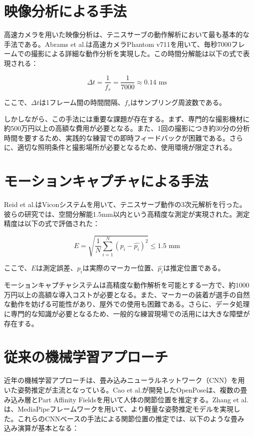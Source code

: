 \documentclass[oneside]{suribt}[11pt]
\begin{document}
\section{映像分析による手法}
高速カメラを用いた映像分析は、テニスサーブの動作解析において最も基本的な手法である。Abrams et al.\cite{abrams2018}は高速カメラPhantom v711を用いて、毎秒7000フレームでの撮影による詳細な動作分析を実現した。この時間分解能は以下の式で表現される：

\begin{equation}
\Delta t = \frac{1}{f_{s}} = \frac{1}{7000} \approx 0.14 \text{ ms}
\end{equation}

ここで、$\Delta t$は1フレーム間の時間間隔、$f_{s}$はサンプリング周波数である。

しかしながら、この手法には重要な課題が存在する。まず、専門的な撮影機材に約500万円以上の高額な費用が必要となる。また、1回の撮影につき約30分の分析時間を要するため、実践的な練習での即時フィードバックが困難である。さらに、適切な照明条件と撮影場所が必要となるため、使用環境が限定される。

\section{モーションキャプチャによる手法}
Reid et al.\cite{serve_analysis}はViconシステムを用いて、テニスサーブ動作の3次元解析を行った。彼らの研究では、空間分解能1.5mm以内という高精度な測定が実現された。測定精度は以下の式で評価された：

\begin{equation}
E = \sqrt{\frac{1}{N}\sum_{i=1}^{N} (p_i - \hat{p_i})^2} \leq 1.5 \text{ mm}
\end{equation}

ここで、$E$は測定誤差、$p_i$は実際のマーカー位置、$\hat{p_i}$は推定位置である。

モーションキャプチャシステムは高精度な動作解析を可能とする一方で、約1000万円以上の高額な導入コストが必要となる。また、マーカーの装着が選手の自然な動作を妨げる可能性があり、屋外での使用も困難である。さらに、データ処理に専門的な知識が必要となるため、一般的な練習現場での活用には大きな障壁が存在する。

\section{従来の機械学習アプローチ}
近年の機械学習アプローチは、畳み込みニューラルネットワーク（CNN）を用いた姿勢推定が主流となっている\cite{goodfellow}。Cao et al.\cite{openpose}が開発したOpenPoseは、複数の畳み込み層とPart Affinity Fieldsを用いて人体の関節位置を推定する。Zhang et al.\cite{mediapipe}は、MediaPipeフレームワークを用いて、より軽量な姿勢推定モデルを実現した。これらのCNNベースの手法による関節位置の推定では、以下のような畳み込み演算が基本となる：
\end{document}
